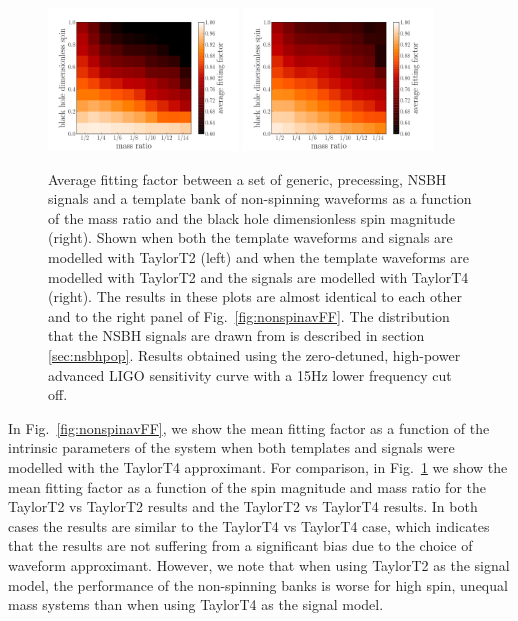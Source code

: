 \begin{figure}
    \centering
    \begin{minipage}[l]{2.0\columnwidth}
    \centering
\includegraphics[width=0.45\textwidth]
{papers/nsbh_effectualness/figure9A.pdf}
\includegraphics[width=0.45\textwidth]
{papers/nsbh_effectualness/figure9B.pdf}
\caption{\label{fig:nonspinavFFT2}
Average fitting factor between a set of generic, precessing, NSBH signals and a
template bank of non-spinning waveforms as a function of the mass ratio and the
black hole dimensionless spin
magnitude (right). Shown when both the
template waveforms and signals are modelled with TaylorT2 (left) and when the
template waveforms are modelled with TaylorT2 and the signals are modelled with
TaylorT4 (right). The results in these plots are almost identical to each other 
and to the right panel of Fig.~\ref{fig:nonspinavFF}.
The distribution that the NSBH
signals are drawn from is described in section \ref{sec:nsbhpop}.
Results obtained
using the zero-detuned, high-power advanced LIGO sensitivity curve with a 15Hz
lower frequency cut off.
}
\end{minipage}
\end{figure}

In Fig.~\ref{fig:nonspinavFF}, we show the mean fitting factor as a function
of the intrinsic parameters of the system when both templates and signals
were modelled with the TaylorT4 approximant. For comparison, in
Fig.~\ref{fig:nonspinavFFT2} we show the mean fitting factor as a function of
the spin magnitude and mass ratio for the TaylorT2 vs TaylorT2 results and the
TaylorT2 vs TaylorT4 results. In both cases the results are similar to the
TaylorT4 vs TaylorT4 case, which indicates that the results are not suffering
from a significant bias due to the choice of waveform approximant. However, we
note that when using TaylorT2 as the signal model, the performance of the
non-spinning banks is worse for high spin, unequal mass systems than when
using TaylorT4 as the signal model.

